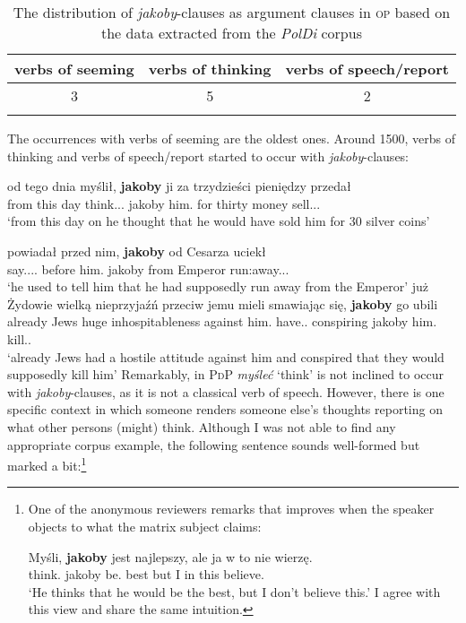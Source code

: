 \documentclass[output=paper
,modfonts
,nonflat]{langsci/langscibook}
\begin{document}
 \begin{table}[h]  \begin{tabular}{ccc}
 \lsptoprule
verbs of seeming & verbs of thinking & verbs of speech\slash report \\
\midrule
3 & 5 & 2  \\
 \lspbottomrule
\end{tabular}
\caption{The distribution of \emph{jakoby}-clauses as argument clauses in \textsc{op} based on the data extracted from the \emph{PolDi} corpus} \label{staropolski_statystka_argument}
\end{table}

\noindent The occurrences with verbs of seeming are the oldest ones. Around 1500, verbs of thinking and verbs of speech\slash report started to occur with \emph{jakoby}-clauses:

\ea \gll od tego dnia myślił, \textbf{jakoby} ji za trzydzieści pieniędzy przedał \\
		from this day think.{\lptcp}.{\sg}.{\masc} jakoby him.{\acc} for thirty money sell.{\lptcp}.{\sg}.{\masc} \\
\glt	`from this day on he thought that he would have sold him for 30 silver coins' 
\z

\ea \ea \gll	powiadał przed nim, \textbf{jakoby} od Cesarza uciekł \\
		say.{\lptcp}.{\sg}.{\masc}.{\hab} before him.{\dat} jakoby from Emperor run:away.{\lptcp}.{\sg}.{\masc} \label{op_1} \\
	\glt	`he used to tell him that he had supposedly run away from the Emperor' 
	\ex\gll		  już Żydowie wielką nieprzyjaźń przeciw jemu mieli smawiając się, \textbf{jakoby} go ubili \label{op_2} \\
            already Jews huge inhospitableness against him.{\dat} have.{\lptcp}.{\vir} conspiring {} jakoby him.{\acc} kill.{\lptcp}.{\vir} \\
	\glt	`already Jews had a hostile attitude against him and conspired that they would supposedly kill him' 
    \z\z
Remarkably, in \textsc{PdP} \emph{myśleć} `think' is not inclined to occur with \emph{jakoby}-clauses, as it is not a classical verb of speech. However, there is one specific context in which someone renders someone else's thoughts reporting on what other persons (might) think. Although I was not able to find any appropriate corpus example, the following sentence sounds well-formed but marked a bit:\footnote{One of the anonymous reviewers remarks that  improves when the speaker objects to what the matrix subject claims:

\ea \gll Myśli, \textbf{jakoby} jest najlepszy, ale ja w to nie wierzę. \\
		think.{\thirdperson}{\sg} jakoby be.{\thirdperson}{\sg} best but I in this {\negation} believe.{\firstperson}{\sg} \\
\glt	 `He thinks that he would be the best, but I don't believe this.'
\z
I agree with this view and share the same intuition.
}
\end{document}
